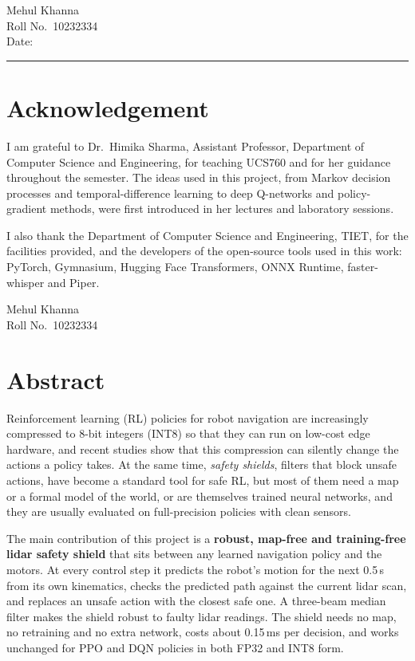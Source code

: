 \documentclass[12pt,a4paper,oneside]{report}
\begin{document}
\vspace{2cm}
\noindent Mehul Khanna\\
Roll No.\ 10232334\\
Date: \rule{4cm}{0.4pt}

\chapter*{Acknowledgement}
I am grateful to Dr.\ Himika Sharma, Assistant Professor, Department of Computer Science and Engineering, for
teaching UCS760 and for her guidance throughout the semester. The ideas used in this project, from Markov decision
processes and temporal-difference learning to deep Q-networks and policy-gradient methods, were first introduced in
her lectures and laboratory sessions.

I also thank the Department of Computer Science and Engineering, TIET, for the facilities provided, and the
developers of the open-source tools used in this work: PyTorch, Gymnasium, Hugging Face Transformers, ONNX Runtime,
faster-whisper and Piper.

\vspace{2cm}
\noindent Mehul Khanna\\
Roll No.\ 10232334

\chapter*{Abstract}
Reinforcement learning (RL) policies for robot navigation are increasingly compressed to 8-bit integers (INT8) so
that they can run on low-cost edge hardware, and recent studies show that this compression can silently change the
actions a policy takes. At the same time, \emph{safety shields}, filters that block unsafe actions, have become a
standard tool for safe RL, but most of them need a map or a formal model of the world, or are themselves trained
neural networks, and they are usually evaluated on full-precision policies with clean sensors.

The main contribution of this project is a \textbf{robust, map-free and training-free lidar safety shield} that sits
between any learned navigation policy and the motors. At every control step it predicts the robot's motion for the
next 0.5\,s from its own kinematics, checks the predicted path against the current lidar scan, and replaces an
unsafe action with the closest safe one. A three-beam median filter makes the shield robust to faulty lidar readings.
The shield needs no map, no retraining and no extra network, costs about 0.15\,ms per decision, and works unchanged
for PPO and DQN policies in both FP32 and INT8 form.
\end{document}

